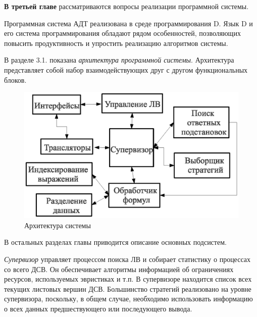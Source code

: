 \documentclass[a4paper]{report}
\begin{document}

\textbf{В третьей главе} рассматриваются вопросы реализации программной системы.

Программная система АДТ реализована в среде программирования D. Язык D и его система программирования обладают рядом особенностей, позволяющих повысить продуктивность и упростить реализацию алгоритмов системы.

В разделе 3.1. показана \emph{архитектура программной системы}. Архитектура представляет собой набор взаимодействующих друг с другом функциональных блоков.
\begin{figure}[htb]
    \centering
    \includegraphics[width=0.6\linewidth]{pics/Design1.eps}
    \caption{Архитектура системы}
    \label{fig:design1}
\end{figure}

В остальных разделах главы приводится описание основных подсистем.

\emph{Супервизор} управляет процессом поиска ЛВ и собирает статистику о процессах со всего ДСВ. Он обеспечивает алгоритмы информацией об ограничениях ресурсов, используемых эвристиках и т.п. В супервизоре находится список всех текущих листовых вершин ДСВ. Большинство стратегий реализовано на уровне супервизора, поскольку, в общем случае, необходимо использовать информацию о всех данных предшествующего или последующего вывода.
\end{document}
